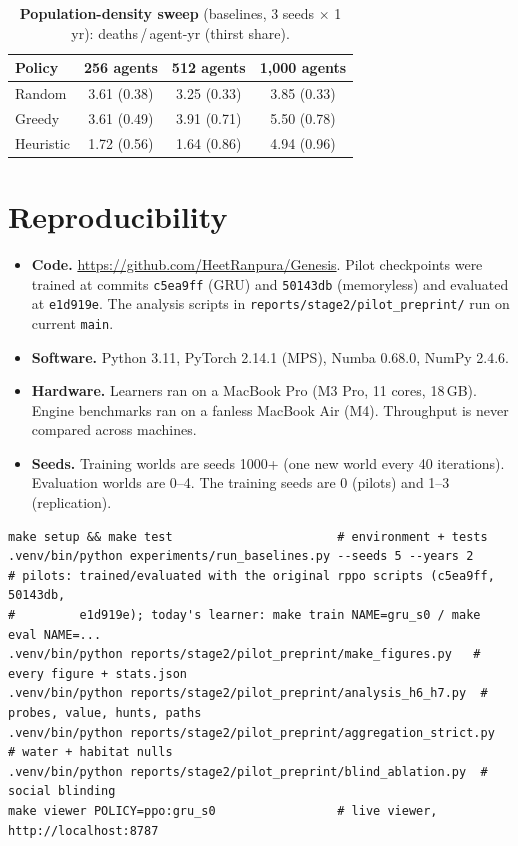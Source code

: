 \documentclass[10pt]{article}
\newcommand{\dpay}{deaths\,/\,agent-yr}
\begin{document}
\begin{table}[h]
\centering\small
\caption{\textbf{Population-density sweep} (baselines, 3 seeds $\times$ 1 yr): \dpay{} (thirst share).}
\begin{tabular}{@{}lccc@{}}
\toprule
Policy & 256 agents & 512 agents & 1{,}000 agents\\
\midrule
Random & 3.61 (0.38) & 3.25 (0.33) & 3.85 (0.33)\\
Greedy & 3.61 (0.49) & 3.91 (0.71) & 5.50 (0.78)\\
Heuristic & 1.72 (0.56) & 1.64 (0.86) & 4.94 (0.96)\\
\bottomrule
\end{tabular}
\end{table}

\section{Reproducibility}
\label{app:repro}
\begin{itemize}
\item \textbf{Code.} \url{https://github.com/HeetRanpura/Genesis}. Pilot checkpoints were trained at commits
\texttt{c5ea9ff} (GRU) and \texttt{50143db} (memoryless) and evaluated at \texttt{e1d919e}. The analysis scripts
in \texttt{reports/stage2/pilot\_preprint/} run on current \texttt{main}.
\item \textbf{Software.} Python 3.11, PyTorch 2.14.1 (MPS), Numba 0.68.0, NumPy 2.4.6.
\item \textbf{Hardware.} Learners ran on a MacBook Pro (M3 Pro, 11 cores, 18\,GB). Engine benchmarks ran on a fanless
MacBook Air (M4). Throughput is never compared across machines.
\item \textbf{Seeds.} Training worlds are seeds 1000+ (one new world every 40 iterations). Evaluation worlds are
0--4. The training seeds are 0 (pilots) and 1--3 (replication).
\end{itemize}
{\footnotesize
\begin{verbatim}
make setup && make test                       # environment + tests
.venv/bin/python experiments/run_baselines.py --seeds 5 --years 2
# pilots: trained/evaluated with the original rppo scripts (c5ea9ff, 50143db,
#         e1d919e); today's learner: make train NAME=gru_s0 / make eval NAME=...
.venv/bin/python reports/stage2/pilot_preprint/make_figures.py   # every figure + stats.json
.venv/bin/python reports/stage2/pilot_preprint/analysis_h6_h7.py  # probes, value, hunts, paths
.venv/bin/python reports/stage2/pilot_preprint/aggregation_strict.py  # water + habitat nulls
.venv/bin/python reports/stage2/pilot_preprint/blind_ablation.py  # social blinding
make viewer POLICY=ppo:gru_s0                 # live viewer, http://localhost:8787
\end{verbatim}
}
\end{document}
